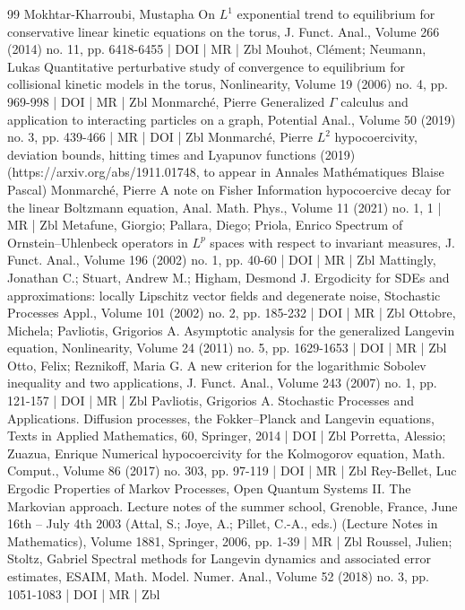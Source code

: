 \begin{thebibliography}{99}
Mokhtar-Kharroubi, Mustapha On ${L}^{1}$ exponential trend to equilibrium for conservative linear kinetic equations on the torus, J. Funct. Anal., Volume 266 (2014) no. 11, pp. 6418-6455 | DOI | MR | Zbl
Mouhot, Clément; Neumann, Lukas Quantitative perturbative study of convergence to equilibrium for collisional kinetic models in the torus, Nonlinearity, Volume 19 (2006) no. 4, pp. 969-998 | DOI | MR | Zbl
Monmarché, Pierre Generalized $\Gamma $ calculus and application to interacting particles on a graph, Potential Anal., Volume 50 (2019) no. 3, pp. 439-466 | MR | DOI | Zbl
Monmarché, Pierre ${L}^2$ hypocoercivity, deviation bounds, hitting times and Lyapunov functions (2019) (https://arxiv.org/abs/1911.01748, to appear in Annales Mathématiques Blaise Pascal)
Monmarché, Pierre A note on Fisher Information hypocoercive decay for the linear Boltzmann equation, Anal. Math. Phys., Volume 11 (2021) no. 1, 1 | MR | Zbl
Metafune, Giorgio; Pallara, Diego; Priola, Enrico Spectrum of Ornstein–Uhlenbeck operators in ${L}^p$ spaces with respect to invariant measures, J. Funct. Anal., Volume 196 (2002) no. 1, pp. 40-60 | DOI | MR | Zbl
Mattingly, Jonathan C.; Stuart, Andrew M.; Higham, Desmond J. Ergodicity for SDEs and approximations: locally Lipschitz vector fields and degenerate noise, Stochastic Processes Appl., Volume 101 (2002) no. 2, pp. 185-232 | DOI | MR | Zbl
Ottobre, Michela; Pavliotis, Grigorios A. Asymptotic analysis for the generalized Langevin equation, Nonlinearity, Volume 24 (2011) no. 5, pp. 1629-1653 | DOI | MR | Zbl
Otto, Felix; Reznikoff, Maria G. A new criterion for the logarithmic Sobolev inequality and two applications, J. Funct. Anal., Volume 243 (2007) no. 1, pp. 121-157 | DOI | MR | Zbl
Pavliotis, Grigorios A. Stochastic Processes and Applications. Diffusion processes, the Fokker–Planck and Langevin equations, Texts in Applied Mathematics, 60, Springer, 2014 | DOI | Zbl
Porretta, Alessio; Zuazua, Enrique Numerical hypocoercivity for the Kolmogorov equation, Math. Comput., Volume 86 (2017) no. 303, pp. 97-119 | DOI | MR | Zbl
Rey-Bellet, Luc Ergodic Properties of Markov Processes, Open Quantum Systems II. The Markovian approach. Lecture notes of the summer school, Grenoble, France, June 16th – July 4th 2003 (Attal, S.; Joye, A.; Pillet, C.-A., eds.) (Lecture Notes in Mathematics), Volume 1881, Springer, 2006, pp. 1-39 | MR | Zbl
Roussel, Julien; Stoltz, Gabriel Spectral methods for Langevin dynamics and associated error estimates, ESAIM, Math. Model. Numer. Anal., Volume 52 (2018) no. 3, pp. 1051-1083 | DOI | MR | Zbl

\end{thebibliography}
